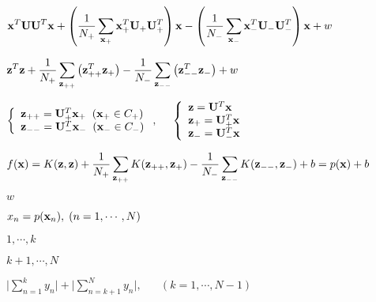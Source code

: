 \documentclass{article}
\def\lthtmlcheckvsize{\ifdim\ht\sizebox<\vsize 
  \ifdim\wd\sizebox<\hsize\expandafter\hfill\fi \expandafter\vfill
  \else\expandafter\vss\fi}%
\begin{document}
{\newpage\clearpage
{}%
$\displaystyle {\bf x}^T{\bf UU}^T{\bf x}
+\left(\frac{1}{N_+}\sum_{{\bf x}_+}{\bf x}_+^T{\bf U}_+{\bf U}_+^T\right){\bf x}
-\left(\frac{1}{N_-}\sum_{{\bf x}_-}{\bf x}_-^T{\bf U}_-{\bf U}_-^T\right){\bf x}
+w$%
\lthtmlindisplaymathZ
\lthtmlcheckvsize\clearpage}

{\newpage\clearpage
{}%
$\displaystyle {\bf z}^T{\bf z}
+\frac{1}{N_+}\sum_{{\bf z}_{++}}\left({\bf z}_{++}^T{\bf z}_+\right)
-\frac{1}{N_-}\sum_{{\bf z}_{--}}\left({\bf z}_{--}^T{\bf z}_-\right)+w$%
\lthtmlindisplaymathZ
\lthtmlcheckvsize\clearpage}

{\newpage\clearpage
{}%
$\displaystyle \left\{\begin{array}{l}{\bf z}_{++}={\bf U}_+^T{\bf x}_+\;\;({\bf x}_+\in C_+)\\
{\bf z}_{--}={\bf U}_-^T{\bf x}_-\;\;({\bf x}_-\in C_-)\end{array}\right.,
\;\;\;\;\;
\left\{\begin{array}{l}
{\bf z}={\bf U}^T{\bf x}\\
{\bf z}_+={\bf U}_+^T{\bf x}\\
{\bf z}_-={\bf U}_-^T{\bf x}
\end{array}\right.$%
\lthtmlindisplaymathZ
\lthtmlcheckvsize\clearpage}

{\newpage\clearpage
{}%
$\displaystyle f({\bf x})=K({\bf z},{\bf z})
+\frac{1}{N_+}\sum_{{\bf z}_{++}}K({\bf z}_{++},{\bf z}_+)
-\frac{1}{N_-}\sum_{{\bf z}_{--}}K({\bf z}_{--},{\bf z}_-)+b
=p({\bf x})+b$%
\lthtmlindisplaymathZ
\lthtmlcheckvsize\clearpage}

{\newpage\clearpage
{}%
$ w$%
\lthtmlindisplaymathZ
\lthtmlcheckvsize\clearpage}

{\newpage\clearpage
{}%
$ x_n=p({\bf x}_n),\;(n=1,\cdots,N)$%
\lthtmlindisplaymathZ
\lthtmlcheckvsize\clearpage}

{\newpage\clearpage
{}%
$ 1,\cdots,k$%
\lthtmlindisplaymathZ
\lthtmlcheckvsize\clearpage}

{\newpage\clearpage
{}%
$ k+1,\cdots,N$%
\lthtmlindisplaymathZ
\lthtmlcheckvsize\clearpage}

{\newpage\clearpage
{}%
$\displaystyle \bigg|\sum_{n=1}^k y_n\bigg|+\bigg|\sum_{n=k+1}^N y_n\bigg|,
\;\;\;\;\;\;(k=1,\cdots,N-1)$%
\lthtmlindisplaymathZ
\lthtmlcheckvsize\clearpage}
\end{document}
